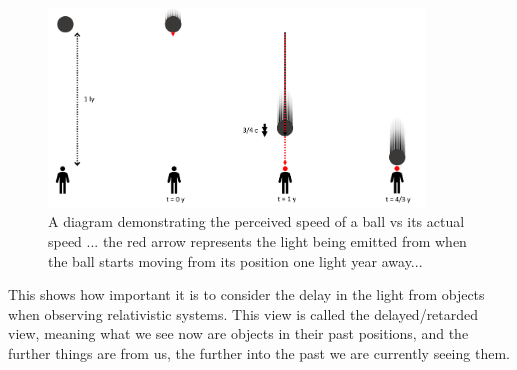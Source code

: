 \begin{figure}[H]
	\centering
	\includegraphics[width = 10cm]{images/pdf/Perceived_speed.pdf}
	\caption{A diagram demonstrating the perceived speed of a ball vs its actual speed ... the red arrow represents the light being emitted from when the ball starts moving from its position one light year away...}
	\label{fig: perceived vs actual speed}
\end{figure}

This shows how important it is to consider the delay in the light from objects when observing relativistic systems.
This view is called the delayed/retarded view, meaning what we see now are objects in their past positions, and the further things are from us, the further into the past we are currently seeing them.






